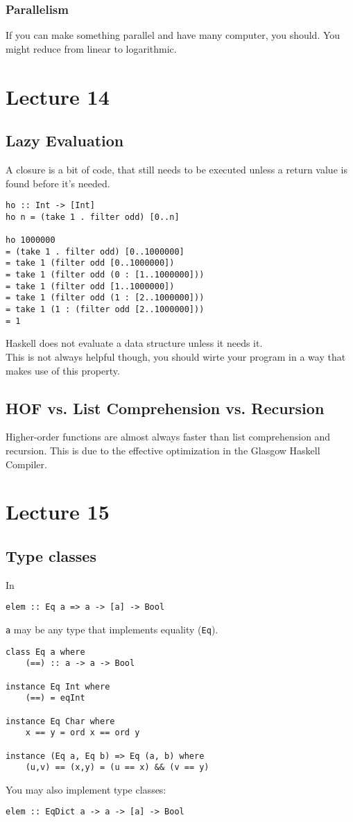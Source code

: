 \documentclass{article}
\begin{document}
\subsubsection{Parallelism}
If you can make something parallel and have many computer, you should. You might reduce from linear to logarithmic.
\section{Lecture 14}
\subsection{Lazy Evaluation}
\begin{definition}
	A closure is a bit of code, that still needs to be executed unless a return value is found before it's needed.
\end{definition}
\begin{verbatim}
ho :: Int -> [Int]
ho n = (take 1 . filter odd) [0..n]

ho 1000000
= (take 1 . filter odd) [0..1000000]
= take 1 (filter odd [0..1000000])
= take 1 (filter odd (0 : [1..1000000]))
= take 1 (filter odd [1..1000000])
= take 1 (filter odd (1 : [2..1000000]))
= take 1 (1 : (filter odd [2..1000000]))
= 1
\end{verbatim}
Haskell does not evaluate a data structure unless it needs it.\\
This is not always helpful though, you should wirte your program in a way that makes use of this property.
\subsection{HOF vs. List Comprehension vs. Recursion}
Higher-order functions are almost always faster than list comprehension and recursion. This is due to the effective optimization in the Glasgow Haskell Compiler.
\section{Lecture 15}
\subsection{Type classes}
In
\begin{verbatim}
elem :: Eq a => a -> [a] -> Bool
\end{verbatim}
\texttt{a} may be any type that implements equality (\texttt{Eq}).\\
\begin{verbatim}
class Eq a where
    (==) :: a -> a -> Bool

instance Eq Int where
    (==) = eqInt

instance Eq Char where
    x == y = ord x == ord y

instance (Eq a, Eq b) => Eq (a, b) where
    (u,v) == (x,y) = (u == x) && (v == y)
\end{verbatim}
You may also implement type classes:
\begin{verbatim}
elem :: EqDict a -> a -> [a] -> Bool
\end{verbatim}
\end{document}
